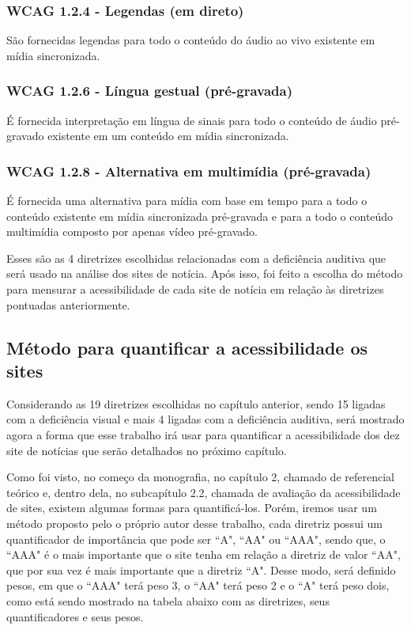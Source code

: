 \documentclass[a4paper]{article}
\begin{document}
\begin{titlepage}
\subsubsection{WCAG 1.2.4 - Legendas (em direto)}

São fornecidas legendas para todo o conteúdo do áudio ao vivo existente em mídia sincronizada.

\subsubsection{WCAG 1.2.6 - Língua gestual (pré-gravada)}

É fornecida interpretação em língua de sinais para todo o conteúdo de áudio pré-gravado existente em um conteúdo em mídia sincronizada.

\subsubsection{WCAG 1.2.8 - Alternativa em multimídia (pré-gravada)}

É fornecida uma alternativa para mídia com base em tempo para a todo o conteúdo existente em mídia sincronizada pré-gravada e para a todo o conteúdo multimídia composto por apenas vídeo pré-gravado.

Esses são as 4 diretrizes escolhidas relacionadas com a deficiência auditiva que será usado na análise dos sites de notícia. Após isso, foi feito a escolha do método para mensurar a acessibilidade de cada site de notícia em relação às diretrizes pontuadas anteriormente.

\subsection{Método para quantificar a acessibilidade os sites}

Considerando as 19 diretrizes escolhidas no capítulo anterior, sendo 15 ligadas com a deficiência visual e mais 4 ligadas com a deficiência auditiva, será mostrado agora a forma que esse trabalho irá usar para quantificar a acessibilidade dos dez site de notícias que serão detalhados no próximo capítulo.

Como foi visto, no começo da monografia, no capítulo 2, chamado de referencial teórico e, dentro dela, no subcapítulo 2.2, chamada de avaliação da acessibilidade de sites, existem algumas formas para quantificá-los. Porém, iremos usar um método proposto pelo o próprio autor desse trabalho, cada diretriz possui um quantificador de importância que pode ser ``A", ``AA" ou ``AAA", sendo que, o ``AAA" é o mais importante que o site tenha em relação a diretriz de valor ``AA", que por sua vez é mais importante que a diretriz ``A". Desse modo, será definido pesos, em que o ``AAA" terá peso 3, o ``AA" terá peso 2 e o ``A" terá peso dois, como está sendo mostrado na tabela abaixo com as diretrizes, seus quantificadores e seus pesos.\\


\end{titlepage}
\end{document}
